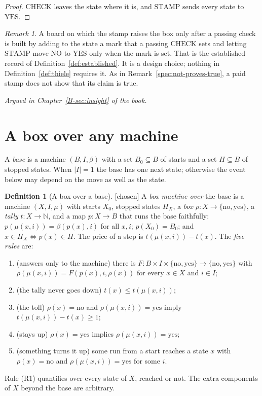 \documentclass[11pt, a4paper]{article}
\theoremstyle{plain}
\theoremstyle{definition}
\newtheorem{definition}[theorem]{Definition}
\theoremstyle{remark}
\newtheorem{remark}[theorem]{Remark}
\newcommand{\N}{\mathbb{N}}
\newcommand{\Bool}{\{\mathrm{no},\mathrm{yes}\}}
\newcommand{\argued}[1]{\par\noindent\textit{Argued in Chapter~\ref{B-#1} of the book.}\par}
\newcommand{\kind}[1]{\textup{[#1]}}
\begin{document}
\begin{proof}
$\mathrm{CHECK}$ leaves the state where it is, and $\mathrm{STAMP}$ sends every state to $\mathrm{YES}$.
\end{proof}

\begin{remark}
A board on which the stamp raises the box only after a passing check is built by adding to the state a
mark that a passing $\mathrm{CHECK}$ sets and letting $\mathrm{STAMP}$ move $\mathrm{NO}$ to
$\mathrm{YES}$ only when the mark is set. That is the established record of Definition~\ref{def:established}.
It is a design choice; nothing in Definition~\ref{def:thiele} requires it. As in
Remark~\ref{spec:not-proves-true}, a paid stamp does not show that its claim is true.
\end{remark}

\argued{sec:insight}

\section{A box over any machine}\label{spec:ch14}

A \emph{base} is a machine $(B,I,\beta)$ with a set $B_0\subseteq B$ of starts and a set $H\subseteq B$ of
stopped states. When $|I|=1$ the base has one next state; otherwise the event below may depend on the move
as well as the state.

\begin{definition}[A box over a base]\label{spec:box-over-base} \kind{chosen}
A \emph{box machine over} the base is a machine $(X,I,\mu)$ with starts $X_0$, stopped states $H_X$, a
\emph{box} $\rho:X\to\Bool$, a \emph{tally} $t:X\to\N$, and a map $p:X\to B$ that runs the base faithfully:
$p(\mu(x,i))=\beta(p(x),i)$ for all $x,i$; $p(X_0)=B_0$; and $x\in H_X\Leftrightarrow p(x)\in H$. The price
of a step is $t(\mu(x,i))-t(x)$. The \emph{five rules} are:
\begin{enumerate}[label=(R\arabic*)]
\item (answers only to the machine) there is $F:B\times I\times\Bool\to\Bool$ with
$\rho(\mu(x,i))=F(p(x),i,\rho(x))$ for every $x\in X$ and $i\in I$;
\item (the tally never goes down) $t(x)\le t(\mu(x,i))$;
\item (the toll) $\rho(x)=\mathrm{no}$ and $\rho(\mu(x,i))=\mathrm{yes}$ imply $t(\mu(x,i))-t(x)\ge1$;
\item (stays up) $\rho(x)=\mathrm{yes}$ implies $\rho(\mu(x,i))=\mathrm{yes}$;
\item (something turns it up) some run from a start reaches a state $x$ with $\rho(x)=\mathrm{no}$ and
$\rho(\mu(x,i))=\mathrm{yes}$ for some $i$.
\end{enumerate}
Rule (R1) quantifies over every state of $X$, reached or not. The extra components of $X$ beyond the base
are arbitrary.
\end{definition}
\end{document}
